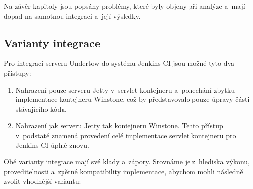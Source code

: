         Na závěr kapitoly jsou popsány problémy, které byly objeny při analýze
        a~mají dopad na samotnou integraci a~její výsledky.
                
        \subsection{Varianty integrace}
            Pro integraci serveru Undertow do systému Jenkins CI jsou možné tyto dva přístupy:

            \begin{enumerate}
                \item{Nahrazení pouze serveru Jetty v~servlet kontejneru a~ponechání
                    zbytku implementace kontejneru Winstone, což by představovalo
                    pouze úpravy části stávajícího kódu. }

                \item{Nahrazení jak serveru Jetty tak kontejneru Winstone. 
                    Tento přístup v~podstatě znamená provedení celé implementace
                    servlet kontejneru pro Jenkins CI úplně znovu.}
            \end{enumerate}

            \noindent Obě varianty integrace mají své klady a~zápory. 
            Srovnáme je z~hlediska výkonu, proveditelnosti a~zpětné kompatibility
            implementace, abychom mohli následně zvolit vhodnější variantu:

